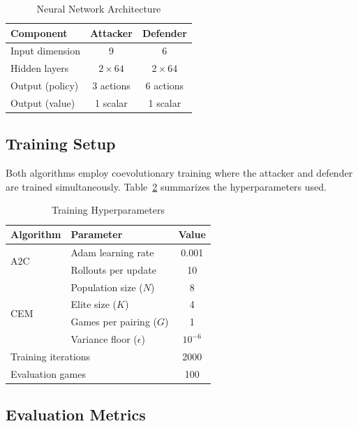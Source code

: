 \documentclass[conference, 10pt]{IEEEtran}
\begin{document}
\begin{table}[h]
\centering
\caption{Neural Network Architecture}
\label{tab:architecture}
\begin{tabular}{lcc}
\toprule
\textbf{Component} & \textbf{Attacker} & \textbf{Defender} \\
\midrule
Input dimension & 9 & 6 \\
Hidden layers & $2 \times 64$ & $2 \times 64$ \\
Output (policy) & 3 actions & 6 actions \\
Output (value) & 1 scalar & 1 scalar \\
\bottomrule
\end{tabular}
\end{table}

\subsection{Training Setup}

Both algorithms employ coevolutionary training where the attacker and defender are trained simultaneously. Table~\ref{tab:hyperparams} summarizes the hyperparameters used.

\begin{table}[h]
\centering
\caption{Training Hyperparameters}
\label{tab:hyperparams}
\begin{tabular}{llc}
\toprule
\textbf{Algorithm} & \textbf{Parameter} & \textbf{Value} \\
\midrule
\multirow{2}{*}{A2C} & Adam learning rate & 0.001 \\
                      & Rollouts per update & 10 \\
\midrule
\multirow{4}{*}{CEM} & Population size ($N$) & 8 \\
                      & Elite size ($K$) & 4 \\
                      & Games per pairing ($G$) & 1 \\
                      & Variance floor ($\epsilon$) & $10^{-6}$ \\
\midrule
\multicolumn{2}{l}{Training iterations} & 2000 \\
\multicolumn{2}{l}{Evaluation games} & 100 \\
\bottomrule
\end{tabular}
\end{table}

\subsection{Evaluation Metrics}
\end{document}
